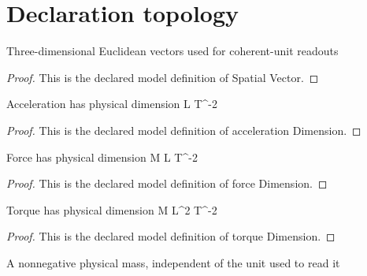 \section{Declaration topology}
\begin{definition}
  \label{def:physics:phyx-mini-0702:phyxminiproblems-problemphyxmini0702-spatialvector}
  Three-dimensional Euclidean vectors used for coherent-unit readouts
\end{definition}
\begin{proof}
  This is the declared model definition of Spatial Vector.
\end{proof}
\begin{definition}
  \label{def:physics:phyx-mini-0702:phyxminiproblems-problemphyxmini0702-accelerationdimension}
  Acceleration has physical dimension L T\textasciicircum{}-2
\end{definition}
\begin{proof}
  This is the declared model definition of acceleration Dimension.
\end{proof}
\begin{definition}
  \label{def:physics:phyx-mini-0702:phyxminiproblems-problemphyxmini0702-forcedimension}
  Force has physical dimension M L T\textasciicircum{}-2
\end{definition}
\begin{proof}
  This is the declared model definition of force Dimension.
\end{proof}
\begin{definition}
  \label{def:physics:phyx-mini-0702:phyxminiproblems-problemphyxmini0702-torquedimension}
  Torque has physical dimension M L\textasciicircum{}2 T\textasciicircum{}-2
\end{definition}
\begin{proof}
  This is the declared model definition of torque Dimension.
\end{proof}
\begin{definition}
  \label{def:physics:phyx-mini-0702:phyxminiproblems-problemphyxmini0702-massquantity}
  A nonnegative physical mass, independent of the unit used to read it
\end{definition}
